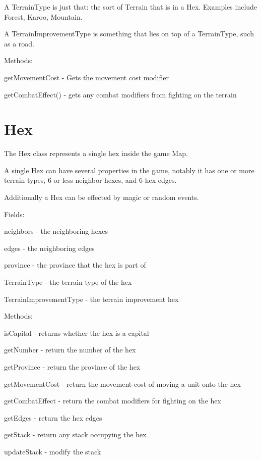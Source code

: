 A TerrainType is just that: the sort of Terrain that is in a Hex. Examples
include Forest, Karoo, Mountain.

A TerrainImprovementType is something that lies on top of a TerrainType,
such as a road.

\begin{al}
	\item[Methods:]	\parbox{\textwidth}{getMovementCost - Gets the movement cost modifier}
	\item[] \parbox{\textwidth}{getCombatEffect() - gets any combat modifiers from fighting on the terrain}
\end{al}


\section*{Hex}
The Hex class represents a single hex inside the game Map.

A single Hex can have several properties in the game, notably it has one or more
terrain types, 6 or less neighbor hexes, and 6 hex edges.

Additionally a Hex can be effected by magic or random events.


\begin{al}
	\item[Fields:]	\parbox{\textwidth}{neighbors - the neighboring hexes}
	\item[] \parbox{\textwidth}{edges - the neighboring edges}
	\item[] \parbox{\textwidth}{province - the province that the hex is part of}
	\item[] \parbox{\textwidth}{TerrainType - the terrain type of the hex}
	\item[] \parbox{\textwidth}{TerrainImprovementType - the terrain improvement hex}
	\item[Methods:] \parbox{\textwidth}{isCapital - returns whether the hex is a capital}
	\item[] \parbox{\textwidth}{getNumber - return the number of the hex}
	\item[] \parbox{\textwidth}{getProvince - return the province of the hex}
	\item[] \parbox{\textwidth}{getMovementCost - return the movement cost of moving a unit onto the hex}
	\item[] \parbox{\textwidth}{getCombatEffect - return the combat modifiers for fighting on the hex}
	\item[] \parbox{\textwidth}{getEdges - return the hex edges}
	\item[] \parbox{\textwidth}{getStack - return any stack occupying the hex}
	\item[] \parbox{\textwidth}{updateStack - modify the stack}
\end{al}

